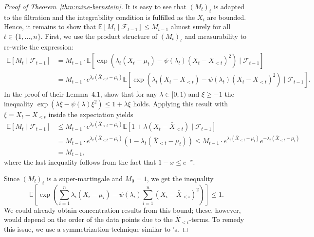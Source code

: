 \documentclass[aos]{imsart2}
\theoremstyle{plain}
\theoremstyle{definition}
\newcommand{\E}{\mathbb{E}}
\newcommand{\xb}{\bar{X}}
\begin{document}
\begin{appendix}
\begin{proof}[Proof of Theorem~\ref{thm:mine-bernstein}]
    It is easy to see that $(M_t)_t$ is adapted to the filtration and the integrability condition is fulfilled as the $X_i$ are bounded. Hence, it remains to show that $\E[M_{t}\mid \mathcal{F}_{t-1}] \leq M_{t-1}$ almost surely for all $t\in\{1,\ldots,n\}$. First, we use the product structure of $(M_t)_t$ and measurability to re-write the expression:
    \begin{align*}
        \E[M_{t}\mid \mathcal{F}_{t-1}] &= M_{t-1} \cdot \E\left[\exp\left(\lambda_{t}(X_{t}-\mu_{t}) - \psi(\lambda_{t})(X_{t}-\xb_{<t})^2\right)\mid \mathcal{F}_{t-1}\right]\\
        &= M_{t-1} \cdot e^{\lambda_t(\xb_{<t}-\mu_t)} \E\left[\exp\left(\lambda_{t}(X_{t}-\xb_{<t}) - \psi(\lambda_{t})(X_{t}-\xb_{<t})^2\right)\mid \mathcal{F}_{t-1}\right].
    \end{align*}
    In the proof of their Lemma~4.1, \citet[eq.~(4.12)]{fan_exponential_2015} show that for any $\lambda \in[0,1)$ and $\xi \geq -1$ the inequality $\exp(\lambda \xi -\psi(\lambda)\xi^2)\leq 1+\lambda \xi$ holds. Applying this result with $\xi = X_t -\xb_{<t}$ inside the expectation yields
    \begin{align*}
        \E[M_{t}\mid \mathcal{F}_{t-1}] &\leq M_{t-1} \cdot e^{\lambda_t(\xb_{<t}-\mu_t)} \E\left[1+\lambda (X_{t}-\xb_{<t})\mid \mathcal{F}_{t-1}\right]\\
        &= M_{t-1} \cdot e^{\lambda_t(\xb_{<t}-\mu_t)} (1-\lambda_t (\xb_{<t}-\mu_t))
        \leq M_{t-1} \cdot e^{\lambda_t(\xb_{<t}-\mu_t)} e^{-\lambda_t(\xb_{<t}-\mu_t)}\\
        &= M_{t-1},
    \end{align*}
    where the last inequality follows from the fact that $1-x \leq e^{-x}$.

    Since $(M_t)_t$ is a super-martingale and $M_0=1$, we get the inequality
    \begin{equation}\label{eq:mgf-asym}
        \E\left[\exp\left(\sum_{i=1}^n\lambda_i(X_i-\mu_i)-\psi(\lambda_i)\sum_{i=1}^n(X_i-\xb_{<i})^2\right)\right] \leq 1.
    \end{equation}
    We could already obtain concentration results from this bound; these, however, would depend on the order of the data points due to the $\xb_{<i}$-terms. To remedy this issue, we use a symmetrization-technique similar to \citet{barber_hoeffding_2024}'s.


\end{proof}
\end{appendix}
\end{document}
